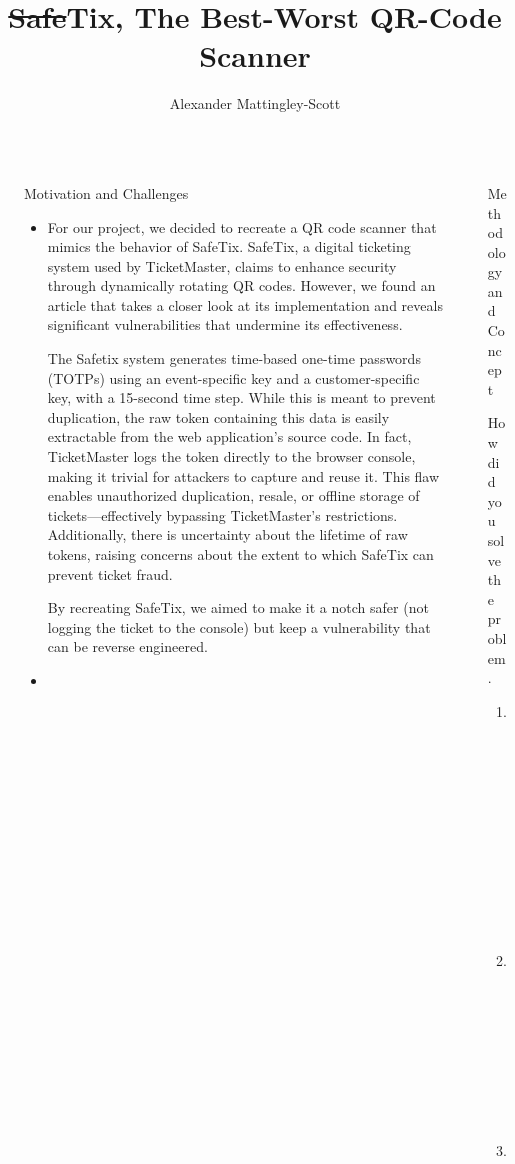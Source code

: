 \documentclass[final,dvipsnames]{beamer}
\title{\sout{Safe}Tix, The Best-Worst QR-Code Scanner}
\author{ \inst{1} \and Alexander Mattingley-Scott \inst{1}}
\institute[shortinst]{\inst{1} Heidelberg University}
\newlength{\sepwidth}
\newlength{\colwidth}
\newcommand{\separatorcolumn}{\begin{column}{\sepwidth}\end{column}}
\begin{document}
\begin{frame}[t, fragile]
\begin{columns}[t]
\separatorcolumn

\begin{column}{\colwidth}

	\begin{block}{Motivation and Challenges}

		\begin{itemize}
			\item For our project, we decided to recreate a QR code scanner that mimics the behavior of SafeTix. 
			SafeTix, a digital ticketing system used by TicketMaster, claims to enhance security through dynamically rotating QR codes. 
			However, we found an article that takes a closer look at its implementation and reveals significant vulnerabilities that undermine its effectiveness.

			The Safetix system generates time-based one-time passwords (TOTPs) using an event-specific key and a customer-specific key, with a 15-second time step. 
			While this is meant to prevent duplication, the raw token containing this data is easily extractable from the web application’s source code. 
			In fact, TicketMaster logs the token directly to the browser console, making it trivial for attackers to capture and reuse it.
			This flaw enables unauthorized duplication, resale, or offline storage of tickets—effectively bypassing TicketMaster’s restrictions. 
			Additionally, there is uncertainty about the lifetime of raw tokens, raising concerns about the extent to which SafeTix can prevent ticket fraud.
			
			By recreating SafeTix, we aimed to make it a notch safer (not logging the ticket to the console) but keep a vulnerability that can be reverse engineered. 
			\item 
		\end{itemize}

	\end{block}


\end{column}

\separatorcolumn

\begin{column}{\colwidth}

	\begin{alertblock}{Methodology and Concept}

		How did you solve the problem.

		\begin{enumerate}
				\item First do this.
				\item Then this.
				\item Then that.
		\end{enumerate}


\end{alertblock}
\end{column}
\end{columns}
\end{frame}
\end{document}

